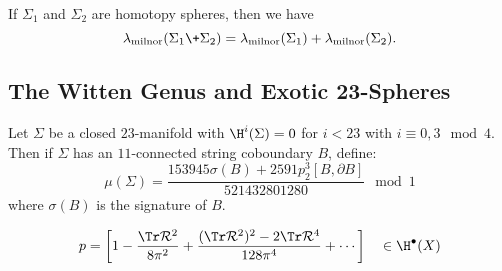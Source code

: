 \begin{proposition}
	If $\Sigma_1$ and $\Sigma_2$ are homotopy spheres, then we have \[\lambda_{\mathrm{milnor}}(\Sigma_1\+\Sigma_2) = \lambda_{\mathrm{milnor}}(\Sigma_1) + \lambda_{\mathrm{milnor}}(\Sigma_2).\]
\end{proposition}


\subsection{The Witten Genus and Exotic $\mathbf{23}$-Spheres}
\begin{definition*}
	Let $\Sigma$ be a closed $23$-manifold with $\H^i(\Sigma)=0$ for $i<23$ with $i\equiv 0,3\mod 4$. Then if $\Sigma$ has an $11$-connected string coboundary $B$, define:
	\[
		\mu(\Sigma) = \frac{153945\sigma(B) + 2591p_2^3[B, \partial B]}{521432801280}\mod 1
	\]
	where $\sigma(B)$ is the signature of $B$.
\end{definition*}


\[
	p = \left[ 1 -\frac{\Tr \mathcal{R}^2}{8\pi^2}  + \frac{(\Tr \mathcal{R}^2)^2  - 2\Tr \mathcal{R}^4}{128\pi^4}+\cdots\right]\quad\in\H^\bullet(X)
\]
